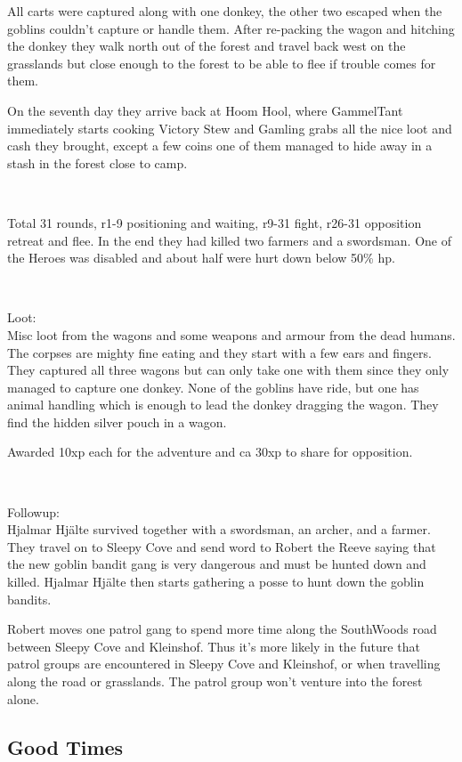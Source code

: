 All carts were captured along with one donkey, the other two escaped when the goblins couldn't capture or handle them.
After re-packing the wagon and hitching the donkey they walk north out of the forest and travel back west on the grasslands but close enough to the forest to be able to flee if trouble comes for them. 

On the seventh day they arrive back at Hoom Hool, where GammelTant immediately starts cooking Victory Stew and Gamling grabs all the nice loot and cash they brought, except a few coins one of them managed to hide away in a stash in the forest close to camp.

\

Total 31 rounds, r1-9 positioning and waiting, r9-31 fight, r26-31 opposition retreat and flee. 
In the end they had killed two farmers and a swordsman. One of the Heroes was disabled and about half were hurt down below 50\% hp.


\

Loot: \\
Misc loot from the wagons and some weapons and armour from the dead humans. The corpses are mighty fine eating and they start with a few ears and fingers.
They captured all three wagons but can only take one with them since they only managed to capture one donkey. None of the goblins have ride, but one has animal handling which is enough to lead the donkey dragging the wagon. They find the hidden silver pouch in a wagon.

Awarded 10xp each for the adventure and ca 30xp to share for opposition.

\

Followup: \\
Hjalmar Hjälte survived together with a swordsman, an archer, and a farmer. They travel on to Sleepy Cove and send word to Robert the Reeve saying that the new goblin bandit gang is very dangerous and must be hunted down and killed. Hjalmar Hjälte then starts gathering a posse to hunt down the goblin bandits.

Robert moves one patrol gang to spend more time along the SouthWoods road between Sleepy Cove and Kleinshof. Thus it's more likely in the future that patrol groups are encountered in Sleepy Cove and Kleinshof, or when travelling along the road or grasslands. The patrol group won't venture into the forest alone.


\subsection*{Good Times}

